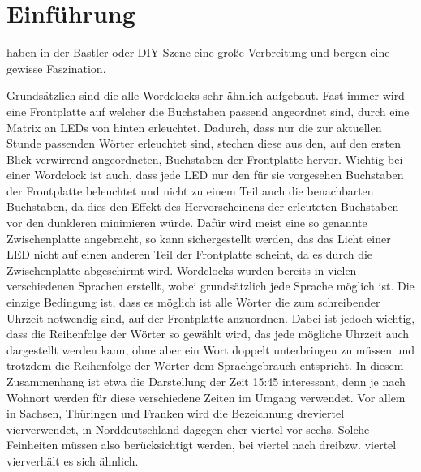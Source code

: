 \documentclass[12pt,journal,compsoc]{IEEEtran}
\begin{document}
%


\section{Einführung}

 haben in der Bastler oder DIY-Szene eine große Verbreitung und bergen eine gewisse Faszination. 


Grundsätzlich sind die alle Wordclocks sehr ähnlich aufgebaut. Fast immer wird eine Frontplatte auf welcher die Buchstaben passend angeordnet sind, durch eine Matrix an LEDs von hinten erleuchtet. Dadurch, dass nur die zur aktuellen Stunde passenden   Wörter erleuchtet sind, stechen diese aus den, auf den ersten Blick verwirrend angeordneten, Buchstaben der Frontplatte hervor. Wichtig bei einer Wordclock ist auch, dass jede LED nur den für sie vorgesehen Buchstaben der Frontplatte beleuchtet und nicht zu einem Teil auch die benachbarten Buchstaben, da dies den Effekt des Hervorscheinens der erleuteten Buchstaben vor den dunkleren minimieren würde. Dafür wird meist eine so genannte Zwischenplatte angebracht, so kann sichergestellt werden, das das Licht  einer LED  nicht  auf einen anderen Teil der Frontplatte scheint, da es durch die Zwischenplatte abgeschirmt wird.
Wordclocks wurden bereits in vielen verschiedenen Sprachen erstellt, wobei  grundsätzlich jede Sprache möglich ist. Die einzige Bedingung ist, dass es möglich ist alle Wörter die zum \glqq schreiben\grqq der Uhrzeit notwendig sind, auf der Frontplatte anzuordnen. Dabei ist jedoch wichtig, dass die Reihenfolge der Wörter so gewählt wird, das jede mögliche Uhrzeit auch dargestellt werden kann, ohne aber ein Wort doppelt unterbringen zu müssen und trotzdem die Reihenfolge der Wörter dem Sprachgebrauch entspricht. In diesem Zusammenhang ist etwa die Darstellung der Zeit 15:45 interessant, denn je nach Wohnort werden für diese verschiedene Zeiten im Umgang verwendet. Vor allem in Sachsen, Thüringen und Franken wird die Bezeichnung \glqq dreviertel vier\grqq verwendet, in Norddeutschland dagegen eher \glqq viertel vor sechs\grqq. Solche Feinheiten müssen also berücksichtigt werden,  bei \glqq viertel nach drei\grqq bzw. \glqq viertel vier\glqq verhält es sich ähnlich.
\end{document}
